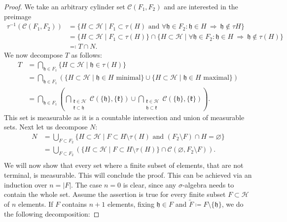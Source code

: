 \begin{proof}
  We take an arbitrary cylinder set \(\mathcal{C}(F_1, F_2)\) and are interested in the preimage
  \begin{align*}
    \tau^{-1}(\mathcal{C}(F_1, F_2))
    & = \{H \subset \mathcal{H} \mid F_1 \subset \tau(H) \text{ and } \forall \mathfrak{h} \in F_2\colon \mathfrak{h} \in H\ \Rightarrow\ \mathfrak{h} \not\in \tau{H}\} \\
    & = \{H \subset \mathcal{H} \mid F_1 \subset \tau(H)\} \cap \{H \subset \mathcal{H} \mid \forall \mathfrak{h} \in F_2\colon \mathfrak{h} \in H\ \Rightarrow\ \mathfrak{h} \not\in \tau(H)\}\\
    & \eqqcolon T \cap N.
  \end{align*}
  We now decompose \(T\) as follows:
  \begin{align*}
    T
    & = \bigcap_{\mathfrak{h} \in F_1}\{H \subset \mathcal{H} \mid \mathfrak{h} \in \tau(H)\}\\
    & = \bigcap_{\mathfrak{h} \in F_1}\left (\{H \subset \mathcal{H} \mid \mathfrak{h} \in H \text{ minimal}\} \cup \{H \subset \mathcal{H} \mid \mathfrak{h} \in H \text{ maximal}\}\right )\\
    & = \bigcap_{\mathfrak{h} \in F_1}\left ( \bigcap_{\substack{\mathfrak{k} \in \mathcal{H}\\\mathfrak{k} \subset \mathfrak{h}}}\mathcal{C}(\{\mathfrak{h}\}, \{\mathfrak{k}\}) \cup \bigcap_{\substack{\mathfrak{k} \in \mathcal{H}\\\mathfrak{h} \subset\mathfrak{k}}} \mathcal{C}(\{\mathfrak{h}\}, \{\mathfrak{k}\})\right ).
  \end{align*}
  This set is measurable as it is a countable intersection and union of measurable sets. Next let us decompose \(N\):
  \begin{align*}
    N
    & = \bigcup_{F \subset F_2} \{H \subset \mathcal{H} \mid F \subset H \setminus \tau(H) \text{ and } (F_2 \setminus F) \cap H = \varnothing\}\\
    & = \bigcup_{F \subset F_2} \left ( \{H \subset \mathcal{H} \mid F \subset H \setminus \tau(H)\} \cap \mathcal{C}(\varnothing, F_2 \setminus F)\right).\\
  \end{align*}
  We will now show that every set where a finite subset of elements, that are not terminal, is measurable. This will conclude the proof. This can be achieved via an induction over \(n = |F|\). The case \(n = 0\) is clear, since any \(\sigma\)-algebra needs to contain the whole set. Assume the assertion is true for every finite subset \(F \subset \mathcal{H}\) of \(n\) elements. If \(F\) contains \(n+1\) elements, fixing \(\mathfrak{h} \in F\) and \(\tilde F \coloneqq F \setminus \{\mathfrak{h}\}\), we do the following decomposition:

\end{proof}
